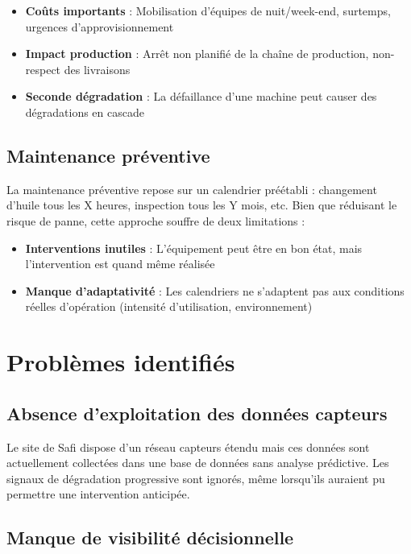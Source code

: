 \documentclass[a4paper,12pt,twoside]{report}
\begin{document}
\begin{itemize}
    \item \textbf{Coûts importants} : Mobilisation d'équipes de nuit/week-end, surtemps, urgences d'approvisionnement
    \item \textbf{Impact production} : Arrêt non planifié de la chaîne de production, non-respect des livraisons
    \item \textbf{Seconde dégradation} : La défaillance d'une machine peut causer des dégradations en cascade
\end{itemize}

\subsection{Maintenance préventive}

La maintenance préventive repose sur un calendrier préétabli : changement d'huile tous les X heures, inspection tous les Y mois, etc. Bien que réduisant le risque de panne, cette approche souffre de deux limitations :

\begin{itemize}
    \item \textbf{Interventions inutiles} : L'équipement peut être en bon état, mais l'intervention est quand même réalisée
    \item \textbf{Manque d'adaptativité} : Les calendriers ne s'adaptent pas aux conditions réelles d'opération (intensité d'utilisation, environnement)
\end{itemize}

\section{Problèmes identifiés}

\subsection{Absence d'exploitation des données capteurs}

Le site de Safi dispose d'un réseau capteurs étendu mais ces données sont actuellement collectées dans une base de données sans analyse prédictive. Les signaux de dégradation progressive sont ignorés, même lorsqu'ils auraient pu permettre une intervention anticipée.

\subsection{Manque de visibilité décisionnelle}
\end{document}
